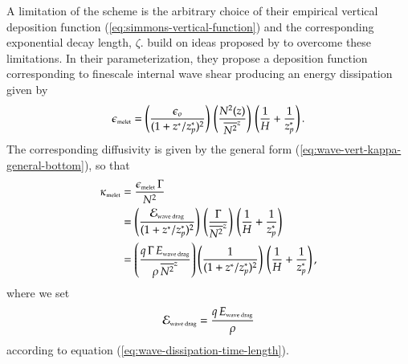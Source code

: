 A limitation of the \cite{Simmonsetal2004} scheme is the arbitrary
choice of their empirical vertical deposition function
(\ref{eq:simmons-vertical-function}) and the corresponding exponential
decay length, $\zeta$.  \cite{Melet_etal_2013} build on ideas proposed
by \cite{Polzin2004,Polzin2009} to overcome these limitations.  In
their parameterization, they propose a deposition function
corresponding to finescale internal wave shear producing an energy
dissipation given by
\begin{equation}
 \epsilon_{\mbox{\tiny melet}} = 
 \left( \frac{\epsilon_{o}}{ (1 + z^{*}/z_{p}^{*})^{2}} \right)
 \, \left( \frac{N^{2}(z)}{\overline{N^{2}}^{z}} \right) 
 \, \left( \frac{1}{H} + \frac{1}{z_{p}^{*}} \right).
\end{equation}
The corresponding diffusivity is given by the general form
(\ref{eq:wave-vert-kappa-general-bottom}), so that 
\begin{equation}
\begin{split}
 \kappa_{\mbox{\tiny melet}} &= 
 \frac{\epsilon_{\mbox{\tiny melet}} \, \Gamma}{N^{2}}
\\
 &= 
 \left( \frac{ {\cal E}_{\mbox{\tiny wave drag}}}{ (1 + z^{*}/z_{p}^{*})^{2}} \right)
 \, \left( \frac{\Gamma}{\overline{N^{2}}^{z}} \right) 
 \, \left( \frac{1}{H} + \frac{1}{z_{p}^{*}} \right)
\\
 &=
 \left( \frac{q \, \Gamma \, E_{\mbox{\tiny wave drag}}}{\rho \, \overline{N^{2}}^{z}} \right)
 \left( \frac{1}{ (1 + z^{*}/z_{p}^{*})^{2}} \right)
\, \left( \frac{1}{H} + \frac{1}{z_{p}^{*}} \right),
\end{split}
\end{equation}
 where we set 
\begin{equation}
{\cal E}_{\mbox{\tiny wave drag}} = \frac{q \,  E_{\mbox{\tiny wave drag}}}{\rho}
\end{equation}
according to equation (\ref{eq:wave-dissipation-time-length}).  

